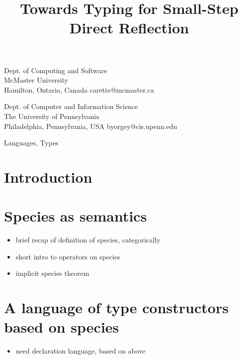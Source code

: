 \documentclass[9pt]{sigplanconf}
\begin{document}
\title{Towards Typing for Small-Step Direct Reflection}

{Dept. of Computing and Software\\ McMaster University\\
Hamilton, Ontario, Canada}
{carette@mcmaster.ca}

{Dept. of Computer and Information Science\\ The University of Pennsylvania\\
Philadelphia, Pennsylvania, USA}
{byorgey@cis.upenn.edu}

\maketitle

\begin{abstract}
\end{abstract}


\terms
Languages, Types

\section{Introduction}\label{sec:intro}

\section{Species as semantics}\label{sec:specsem}
\begin{itemize}
\item brief recap of definition of species, categorically
\item short intro to operators on species
\item implicit species theorem
\end{itemize}

\section{A language of type constructors based on species}\label{sec:language}
\begin{itemize}
\item need declaration language, based on above
\end{itemize}
\end{document}
